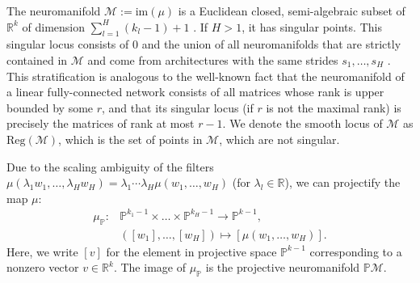 \documentclass[twoside]{article}
\theoremstyle{definition}
\theoremstyle{remark}
\begin{document}
The neuromanifold $\mathcal{M} := \mathrm{im}(\mu)$ is a Euclidean closed, semi-algebraic subset of $\mathbb{R}^k$ of dimension $\sum_{l=1}^H (k_l-1) + 1$ \cite[Theorem~2.4]{kohn2024function}. 
If $H>1$, it has singular points. 
This singular locus consists of $0$ and the union of all neuromanifolds that are strictly contained in $\mathcal{M}$ and come from architectures with the same strides $s_1, \ldots, s_H$ \cite[Theorem~2.9]{kohn2024function}. 
This stratification is analogous to the well-known fact that the neuromanifold of a linear fully-connected network consists of all matrices whose rank is upper bounded by some $r$, and that its singular locus (if $r$ is not the maximal rank) is precisely the matrices of rank at most $r-1$. We denote the smooth locus of $\mathcal{M}$ as $\mathrm{Reg}(\mathcal{M})$, which is the set of points in $\mathcal{M}$, which are not singular.


Due to the scaling ambiguity of the filters 
$\mu(\lambda_1 w_1, \ldots, \lambda_H w_H) = \lambda_1 \cdots \lambda_H \mu(w_1, \ldots, w_H)$ (for $\lambda_l \in \mathbb{R}$), 
we can projectify the map $\mu$:
\begin{align*}
    \mu_\mathbb{P}: & \mathbb{P}^{k_1-1} \times \ldots \times \mathbb{P}^{k_H-1} \to \mathbb{P}^{k-1}, 
    \\
    & ([w_1], \ldots, [w_H]) \mapsto [\mu(w_1, \ldots, w_H)].
\end{align*}
Here, we write $[v]$ for the  element in projective space $\mathbb{P}^{k-1}$ corresponding to a nonzero vector $v \in \mathbb{R}^k$.
The image of $\mu_\mathbb{P}$ is the projective neuromanifold $\mathbb{P}\mathcal{M}$.
\end{document}
